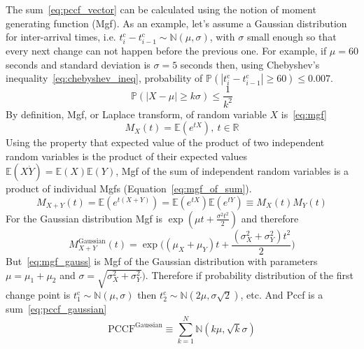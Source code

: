 The sum~\ref{eq:pccf_vector} can be calculated using the notion of moment generating function (Mgf).
As an example, let's assume a Gaussian distribution for inter-arrival times, i.e. $t_{i}^{\text{c}} - t_{i-1}^{\text{c}} \sim \mathbb{N}(\mu, \sigma)$,
with $\sigma$ small enough so that every next change can not happen before the previous one.
For example, if $\mu=60$ seconds and standard deviation is $\sigma=5$ seconds then, using Chebyshev's inequality~\ref{eq:chebyshev_ineq}, probability of
$\mathbb{P}(|t_{i}^{\text{c}} - t_{i-1}^{\text{c}}| \geq 60) \leq 0.007$.
\begin{equation}\label{eq:chebyshev_ineq}
	\mathbb{P}(|X-\mu| \geq k \sigma) \leq \frac{1}{k^2} 
\end{equation}
By definition, Mgf, or Laplace transform, of random variable $X$ is~\ref{eq:mgf}
\begin{equation}\label{eq:mgf}
	M_{X}(t) = \mathbb{E}(e^{t X}), \: t \in \mathbb{R}
\end{equation}
Using the property that expected value of the product of two independent random variables is the product of their expected values $\mathbb{E}(X \dot Y)=\mathbb{E}(X)\mathbb{E}(Y)$, Mgf of the sum of independent random variables is a product of individual Mgfs (Equation~\ref{eq:mgf_of_sum}).
\begin{equation}\label{eq:mgf_of_sum}
	M_{X+Y}(t) = \mathbb{E}(e^{t (X+Y)}) = \mathbb{E}(e^{t X}) \mathbb{E} (e^{t Y}) \equiv M_{X}(t) M_{Y}(t)
\end{equation}
For the Gaussian distribution Mgf is $\exp{(\mu t + \frac{\sigma^2 t^2}{2})}$ and therefore
\begin{equation}\label{eq:mgf_gauss}
	M_{X+Y}^{\text{Gaussian}}(t)  = \exp \Big ((\mu_X + \mu_Y) t + \frac{(\sigma_X^2 + \sigma_Y^2) t^2}{2} \Big )
\end{equation}
But~\ref{eq:mgf_gauss} is Mgf of the Gaussian distribution with parameters $\mu=\mu_1+\mu_2$ and $\sigma=\sqrt{\sigma_X^2 + \sigma_Y^2})$.
Therefore if probability distribution of the first change point is $t_1^{\text{c}} \sim \mathbb{N}(\mu, \sigma)$ then $t_2^{\text{c}} \sim \mathbb{N}(2\mu, \sigma \sqrt{2})$, etc.
And Pccf is a sum~\ref{eq:pccf_gaussian}
\begin{equation}\label{eq:pccf_gaussian}
	\text{PCCF}^{\text{Gaussian}} \equiv \sum_{k=1}^N \mathbb{N}(k \mu, \sqrt{k} \sigma)
\end{equation}

